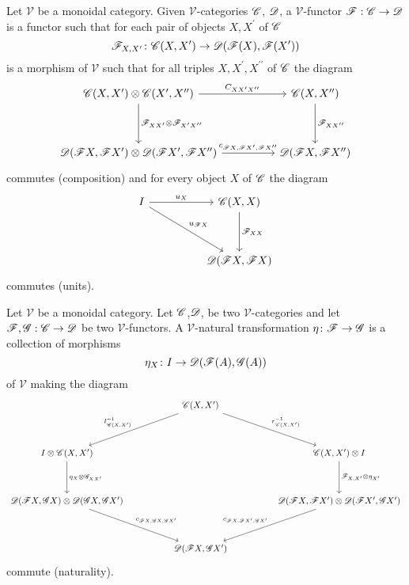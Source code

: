 \documentclass[dissertation.tex]{subfiles}
\begin{document}
\begin{defn}
  Let $\mathscr{V}$ be a monoidal category.
  Given $\mathscr{V}$-categories $\mathscr{C}$, $\mathscr{D}$, a $\mathscr{V}$-functor $\mathscr{F} : \mathscr{C} \to \mathscr{D}$ is a functor such that for each pair of objects $X,X^\prime$ of $\mathscr{C}$
  $$\mathscr{F}_{X,X^\prime} \colon \mathscr{C}(X,X^\prime) \to \mathscr{D}(\mathscr{F}(X),\mathscr{F}(X^\prime))$$
  is a morphism of $\mathscr{V}$
  such that for all triples $X,X^\prime, X^{\prime\prime}$ of $\mathscr{C}$ the diagram
  $$\begin{tikzcd}
    \CC(X,X^\prime) \otimes \CC(X^\prime, X^{\prime\prime}) \arrow{rr}{C_{XX{^\prime}X^{\prime\prime}}}\arrow{dd}{\F_{XX^\prime} \otimes \F_{X^\prime X^{\prime\prime}}} && \CC(X,X^{\prime\prime})\arrow{dd}{\F_{XX^{\prime\prime}}}\\
    \\
    \D(\F X, \F X^\prime) \otimes \D(\F X^\prime, \F X^{\prime\prime}) \arrow{rr}{c_{\F X,\F X^\prime,\F X^{\prime\prime}}}&& \D(\F X, \F X^{\prime\prime})
  \end{tikzcd}$$
  commutes (composition)
  and for every object $X$ of $\mathscr{C}$ the diagram
  $$\begin{tikzcd}
    I \arrow{rr}{u_X}\arrow{rrdd}{u_{\F X}} && \CC(X,X)\arrow{dd}{\F_{XX}}\\
    \\
    &&\D(\F X, \F X)
  \end{tikzcd}$$
  commutes (units).
\end{defn}

\begin{defn}\label{VNatDefn}
  Let $\mathscr{V}$ be a monoidal category.
  Let $\mathscr{C}$,$\mathscr{D}$, be two $\mathscr{V}$-categories and let $\mathscr{F},\mathscr{G} : \mathscr{C} \to \mathscr{D}$ be two $\mathscr{V}$-functors.
  A $\mathscr{V}$-natural transformation $\eta \colon \mathscr{F} \to \mathscr{G}$ is a collection of morphisms
  $$\eta_X \colon I \to \mathscr{D}(\mathscr{F}(A), \mathscr{G}(A))$$
  of $\mathscr{V}$ making the diagram
  $$\begin{tikzcd}
    && \CC(X,X^\prime) \arrow[swap]{lldd}{l^{-1}_{\CC(X,X^\prime)}} \arrow{rrdd}{r^{-1}_{\CC(X,X^\prime)}}\\
    \\
    I \otimes \CC(X,X^\prime)\arrow{dd}{\eta_X \otimes \G_{XX^\prime}} &&&& \CC(X,X^\prime) \otimes I\arrow{dd}{\F_{X,X^\prime} \otimes \eta_{X^\prime}}\\
    \\
    \D(\F X, \G X) \otimes \D(\G X, \G X^\prime) \arrow{rrdd}{c_{\F X, \G X, \G X^\prime}} &&&& \D(\F X, \F X^\prime) \otimes \D(\F X^\prime, \G X^\prime) \arrow[swap]{lldd}{c_{\F X, \F X^\prime, \G X^\prime}}\\
    \\
    && \D(\F X, \G X^\prime)
  \end{tikzcd}$$
  commute (naturality).
\end{defn}
\end{document}
